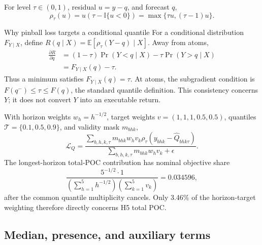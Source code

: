 \documentclass[10pt,letterpaper]{article}
\numberwithin{equation}{section}
\newcommand{\E}{\mathbb{E}}
\newcommand{\I}{\mathbb{I}}
\theoremstyle{definition}
\theoremstyle{remark}
\begin{document}
For level \(\tau\in(0,1)\), residual \(u=y-q\), and forecast \(q\),
\begin{equation}
\rho_\tau(u)=u\left(\tau-\I\{u<0\}\right)
=\max\{\tau u,(\tau-1)u\}.
\label{eq:pinball}
\end{equation}

\begin{derivationbox}{Why pinball loss targets a conditional quantile}
For a conditional distribution \(F_{Y\mid X}\), define
\(R(q\mid X)=\E[\rho_\tau(Y-q)\mid X]\). Away from atoms,
\begin{align}
\frac{\partial R}{\partial q}
&=(1-\tau)\Pr(Y<q\mid X)-\tau\Pr(Y>q\mid X)\nonumber\\
&=F_{Y\mid X}(q)-\tau.
\label{eq:pinball-derivative}
\end{align}
Thus a minimum satisfies \(F_{Y\mid X}(q)=\tau\). At atoms, the subgradient
condition is \(F(q^-)\leq\tau\leq F(q)\), the standard quantile definition.
This consistency concerns \(Y\); it does not convert \(Y\) into an executable
return.
\end{derivationbox}

With horizon weights \(w_h=h^{-1/2}\), target weights
\(v=(1,1,1,0.5,0.5)\), quantiles
\(\mathcal{T}=\{0.1,0.5,0.9\}\), and validity mask \(m_{bhk}\),
\begin{equation}
\mathcal{L}_Q=
\frac{\sum_{b,h,k,\tau}m_{bhk}w_hv_k
\rho_\tau(y_{bhk}-\widehat Q_{bhk\tau})}
{\sum_{b,h,k,\tau}m_{bhk}w_hv_k+\epsilon}.
\label{eq:weighted-pinball}
\end{equation}
The longest-horizon total-POC contribution has nominal objective share
\begin{equation}
\frac{5^{-1/2}\cdot1}
{\left(\sum_{h=1}^{5}h^{-1/2}\right)
\left(\sum_{k=1}^{5}v_k\right)}
=0.034596,
\label{eq:h5-share}
\end{equation}
after the common quantile multiplicity cancels. Only 3.46\% of the
horizon-target weighting therefore directly concerns H5 total POC.

\subsection{Median, presence, and auxiliary terms}
\end{document}
